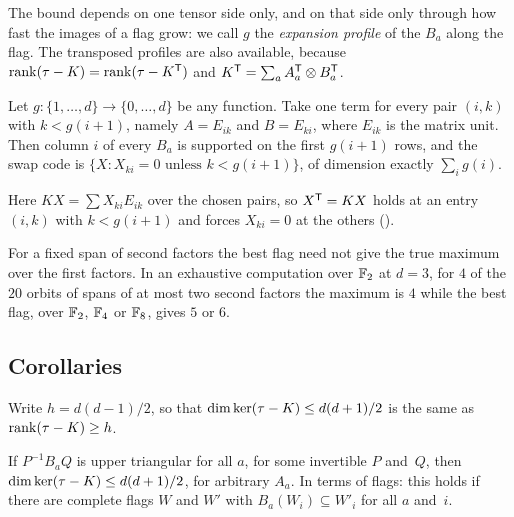 The bound depends on one tensor side only, and on that side only through how fast the images of a flag grow: we call
$g$ the \emph{expansion profile} of the $B_a$ along the flag. The transposed profiles are also available, because
$\operatorname{rank}(\tau-K)=\operatorname{rank}(\tau-K^{\mathsf{T}})$ and $K^{\mathsf{T}}=\sum_aA_a^{\mathsf{T}}\otimes B_a^{\mathsf{T}}$.

\begin{proposition}\label{prop:attained}
Let $g\colon\{1,\dots,d\}\to\{0,\dots,d\}$ be any function. Take one term for every pair $(i,k)$ with $k<g(i+1)$,
namely $A=E_{ik}$ and $B=E_{ki}$, where $E_{ik}$ is the matrix unit. Then column $i$ of every $B_a$ is supported on
the first $g(i+1)$ rows, and the swap code is $\{X:X_{ki}=0\text{ unless }k<g(i+1)\}$, of dimension exactly
$\sum_ig(i)$.
\end{proposition}

\begin{outline}
Here $KX=\sum X_{ki}E_{ik}$ over the chosen pairs, so $X^{\mathsf{T}}=KX$ holds at an entry $(i,k)$ with $k<g(i+1)$ and forces
$X_{ki}=0$ at the others ().
\end{outline}

\begin{remark}\label{rem:not-tight}
For a fixed span of second factors the best flag need not give the true maximum over the first factors. In an
exhaustive computation over $\mathbb{F}_2$ at $d=3$, for $4$ of the $20$ orbits of spans of at most two second factors the
maximum is $4$ while the best flag, over $\mathbb{F}_2$, $\mathbb{F}_4$ or $\mathbb{F}_8$, gives $5$ or $6$.
\end{remark}

\subsection{Corollaries}

Write $h=d(d-1)/2$, so that $\dim\ker(\tau-K)\le d(d+1)/2$ is the same as $\operatorname{rank}(\tau-K)\ge h$.

\begin{corollary}\label{cor:triangular}
If $P^{-1}B_aQ$ is upper triangular for all $a$, for some invertible $P$ and~$Q$, then $\dim\ker(\tau-K)\le d(d+1)/2$,
for arbitrary $A_a$. In terms of flags: this holds if there are complete flags $W$ and $W'$ with
$B_a(W_i)\subseteq W'_i$ for all $a$ and~$i$.
\end{corollary}

